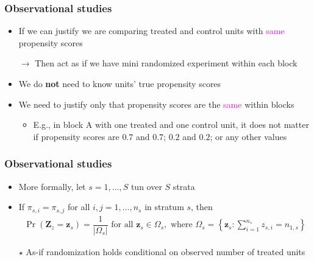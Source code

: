 \documentclass[table, xcolor = {dvipsnames}, 9pt]{beamer}
\theoremstyle{plain}
\begin{document}
\begin{frame}[t]
\frametitle{Observational studies}
\vfill
\begin{itemize} \vfill
\item If we can justify we are comparing treated and control units with \textcolor{magenta}{same} propensity scores \vfill
\item[] $\rightarrow$ Then act as if we have mini randomized experiment within each block \vfill
\item We do \textbf{not} need to know units' true propensity scores \vfill
\item We need to justify only that propensity scores are the \textcolor{magenta}{same} within blocks \vfill
\begin{itemize} \vfill
\item E.g., in block A with one treated and one control unit, it does not matter if propensity scores are $0.7$ and $0.7$; $0.2$ and $0.2$; or any other values \vfill
\end{itemize} \vfill
\end{itemize} \vfill
\end{frame}
\begin{frame}[t]
\frametitle{Observational studies}
\vfill
\begin{itemize} \vfill
\item More formally, let $s = 1, \ldots , S$ tun over $S$ strata \vfill
\item If $\pi_{s,i} = \pi_{s,j}$ for all $i,j = 1, \ldots , n_s$ in stratum $s$, then \vfill 
\begin{align*}
\Pr\left(\bm{Z}_z = \bm{z}_s\right) = \dfrac{1}{\left\lvert \Omega_s \right\rvert} \text{ for all } \bm{z}_s \in \Omega_s, \text{ where } \Omega_s = \left\{\bm{z}_s: \sum \limits_{i = 1}^{n_s} z_{s,i} = n_{1,s}\right\}
\end{align*} \vfill
\item[$\star$] As-if randomization holds conditional on observed number of treated units \vfill
\end{itemize} \vfill
\end{frame}
\end{document}
